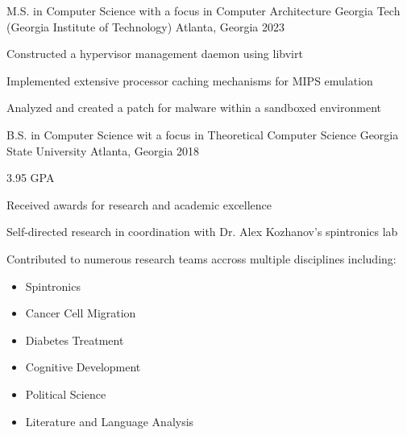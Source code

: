 


\begin{cventries}


\cventry
{M.S. in Computer Science with a focus in Computer Architecture} %
{Georgia Tech (Georgia Institute of Technology)} %
{Atlanta, Georgia} %
{2023} %
{ %
\begin{cvitems}
\item {Constructed a hypervisor management daemon using libvirt}
\item {Implemented extensive processor caching mechanisms for MIPS emulation}
\item {Analyzed and created a patch for malware within a sandboxed environment}
\end{cvitems}
}

\cventry
{B.S. in Computer Science wit a focus in Theoretical Computer Science} %
{Georgia State University} %
{Atlanta, Georgia} %
{2018} %
{ %
\begin{cvitems}
\item{3.95 GPA}
\item{Received awards for research and academic excellence}
\item{Self-directed research in coordination with Dr. Alex Kozhanov's spintronics lab}
\item{Contributed to numerous research teams accross multiple disciplines including:}
\begin{itemize}
\item{Spintronics}
\item{Cancer Cell Migration}
\item{Diabetes Treatment}
\item{Cognitive Development}
\item{Political Science}
\item{Literature and Language Analysis}
\end{itemize}
\end{cvitems}
}


\end{cventries}
